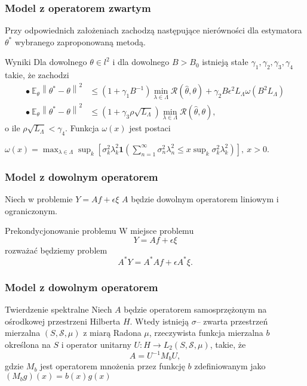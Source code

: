 \documentclass{beamer}
\newcommand{\norm}[1]{\left\lVert#1\right\rVert}
\begin{document}
\begin{frame}\frametitle{Model z operatorem zwartym}
\begin{center}
Przy odpowiednich założeniach zachodzą następujące nierówności dla estymatora $\theta^*$ wybranego zaproponowaną metodą.
\end{center}
\begin{block}{Wyniki}
Dla dowolnego $\theta\in l^2$ i dla dowolnego $B>B_0$ istnieją stałe $\gamma_1,\gamma_2,\gamma_3,\gamma_4$ takie, że zachodzi
\begin{displaymath}
\begin{split}
\bullet\ \mathbb{E}_{\theta}\norm{\theta^*-\theta}^2&\leq (1+\gamma_1B^{-1})\min_{\lambda\in \Lambda}\mathcal{R}(\hat{\theta},\theta)+\gamma_2B\epsilon^2L_{\Lambda}\omega(B^2L_{\Lambda})\\
\bullet\ \mathbb{E}_{\theta}\norm{\theta^*-\theta}^2&\leq (1+\gamma_3\rho\sqrt{L_{\Lambda}})\min_{\lambda\in \Lambda}\mathcal{R}(\hat{\theta},\theta),
\end{split}
\end{displaymath}
o ile $\rho\sqrt{L_{\Lambda}}<\gamma_4$. Funkcja $\omega(x)$ jest postaci
\begin{center}
$\omega(x)=\max_{\lambda\in \Lambda}\sup_k\left[\sigma_k^2\lambda_k^2\pmb{1}\left(\sum_{n=1}^{\infty}\sigma_n^2\lambda_n^2\leq x \sup_k\sigma_k^2\lambda_k^2\right)\right],\ x>0.$
\end{center}
\end{block}
\end{frame}



\begin{frame}\frametitle{Model z dowolnym operatorem}
\begin{center}
Niech w problemie $Y=Af+\epsilon\xi$ $A$ będzie dowolnym operatorem liniowym i ograniczonym.
\end{center}
\begin{block}{Prekondycjonowanie problemu}
W miejsce problemu 
\begin{displaymath}
Y=Af+\epsilon\xi
\end{displaymath}
rozważać będziemy problem
\begin{displaymath}
A^*Y=A^*Af+\epsilon A^*\xi.
\end{displaymath}
\end{block}
\end{frame}

\begin{frame}\frametitle{Model z dowolnym operatorem}
\begin{block}{Twierdzenie spektralne}
Niech $A$ będzie operatorem samosprzężonym na ośrodkowej przestrzeni Hilberta $H$. Wtedy istnieją $\sigma$-- zwarta przestrzeń mierzalna $(S,\mathcal{S},\mu )$ z miarą Radona $\mu$, rzeczywista funkcja mierzalna $b$ określona na $S$ i operator unitarny $U\colon H\to L_2(S,\mathcal{S},\mu )$, takie, że 
\begin{displaymath}
A=U^{-1}M_bU,
\end{displaymath}
gdzie $M_b$ jest operatorem mnożenia przez funkcję $b$ zdefiniowanym jako $(M_bg)(x)=b(x)g(x)$
\end{block}
\end{frame}
\end{document}
